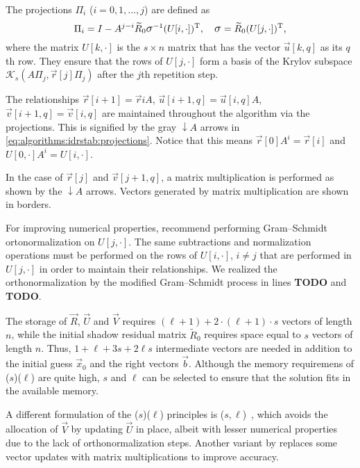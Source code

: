 The projections $\Pi_i$ ($i = 0, 1, \ldots, j$) are defined as
\begin{equation}
  \Pi_i = I - A^{j - i} \widetilde{R}_0 \largesigma^{-1} (U[i, \cdot])^\T,
  \quad \largesigma = \widetilde{R}_0 (U[j, \cdot])^\T \text,
\end{equation}
where the matrix $U[k, \cdot]$ is the $s \times n$ matrix that has the
vector $\vec{u}[k, q]$ as its $q$th row. They ensure that the rows of
$U[j, \cdot]$ form a basis of the Krylov subspace
$\mathcal{K}_s(A \Pi_j, \vec{r}[j] \Pi_j)$ after the $j$th repetition
step.

The relationships $\vec{r}[i + 1] = \vec{r}{i} A$,
$\vec{u}[i + 1, q] = \vec{u}[i, q] A$,
$\vec{v}[i + 1, q] = \vec{v}[i, q]$ are maintained throughout the
algorithm via the projections. This is signified by the gray
{\color{black!50}$\downarrow A$} arrows in
\cref{eq:algorithms:idrstab:projections}. Notice that this means
$\vec{r}[0] A^i = \vec{r}[i]$ and $U[0, \cdot] A^i = U[i, \cdot]$.

In the case of $\vec{r}[j]$ and $\vec{v}[j + 1, q]$, a matrix
multiplication is performed as shown by the $\downarrow A$
arrows. Vectors generated by matrix multiplication are shown in
borders.

For improving numerical properties, \citet{sleijpen2010exploiting}
recommend performing Gram--Schmidt ortonormalization on $U[j, \cdot]$.
The same subtractions and normalization operations must be performed
on the rows of $U[i, \cdot]$, $i \ne j$ that are performed in
$U[j, \cdot]$ in order to maintain their relationships. We realized
the orthonormalization by the modified Gram--Schmidt process in lines
\textbf{TODO} and \textbf{TODO}.

The storage of $\vec{R}$, $\vec{U}$ and $\vec{V}$ requires
$(\ell + 1) + 2 \cdot (\ell + 1) \cdot s$ vectors of length $n$, while
the initial shadow residual matrix $\widetilde{R}_0$ requires space
equal to $s$ vectors of length $n$. Thus, $1 + \ell + 3s + 2\ell s$
intermediate vectors are needed in addition to the initial guess
$\vec{x}_0$ and the right vectors $\vec{b}$. Although the memory
requiremens of ($s$)($\ell$) are quite high,
$s$ and $\ell$ can be selected to ensure that the solution fits in the
available memory.

A different formulation of the ($s$)($\ell$)
principles is ($s, \ell$)~\citep{tanio2010gbi},
which avoids the allocation of $\vec{V}$ by updating $\vec{U}$ in
place, albeit with lesser numerical properties due to the lack of
orthonormalization steps. Another variant by
\textcite{aihara2014variant} replaces some vector updates with matrix
multiplications to improve accuracy.

